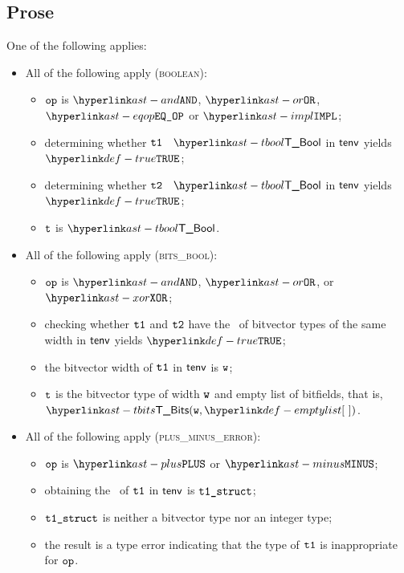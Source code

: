 \subsection{Prose}
One of the following applies:
\begin{itemize}
  \item All of the following apply (\textsc{boolean}):
  \begin{itemize}
    \item $\texttt{op}$ is $\AND$, $\OR$, $\EQOP$ or $\IMPL$;
    \item determining whether $\texttt{t1}$ \typesatisfies\ $\TBool$ in $\textsf{tenv}$ yields $\True$\ProseOrTypeError;
    \item determining whether $\texttt{t2}$ \typesatisfies\ $\TBool$ in $\textsf{tenv}$ yields $\True$\ProseOrTypeError;
    \item $\texttt{t}$ is $\TBool$.
  \end{itemize}

  \item All of the following apply (\textsc{bits\_bool}):
  \begin{itemize}
    \item $\texttt{op}$ is $\AND$, $\OR$, or $\XOR$;
    \item checking whether $\texttt{t1}$ and $\texttt{t2}$ have the \structure\ of bitvector types
          of the same width in $\textsf{tenv}$ yields $\True$\ProseOrTypeError;
    \item the bitvector width of $\texttt{t1}$ in $\textsf{tenv}$ is $\texttt{w}$;
    \item $\texttt{t}$ is the bitvector type of width $\texttt{w}$ and empty list of bitfields, that is, \\ $\TBits(\vw, \emptylist)$.
  \end{itemize}

  \item All of the following apply (\textsc{plus\_minus\_error}):
  \begin{itemize}
    \item $\texttt{op}$ is $\PLUS$ or $\MINUS$;
    \item obtaining the \structure\ of $\texttt{t1}$ in $\textsf{tenv}$ is $\texttt{t1\_struct}$\ProseOrTypeError;
    \item $\texttt{t1\_struct}$ is neither a bitvector type nor an integer type;
    \item the result is a type error indicating that the type of $\texttt{t1}$ is inappropriate for $\texttt{op}$.
  \end{itemize}


\end{itemize}
